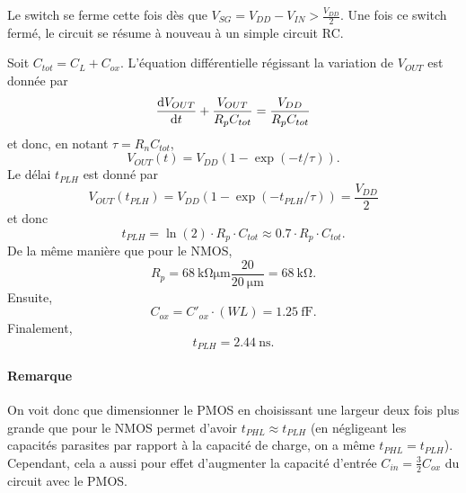 \documentclass[frenchb,DIV=14]{scrartcl}
\begin{document}
\begin{center}
\end{center}

Le switch se ferme cette fois dès que $V_{SG} = V_{DD} - V_{IN} > \frac{V_{DD}}{2}$.
Une fois ce switch fermé, le circuit se résume à nouveau à un simple circuit RC.

\begin{center}
\end{center}

Soit $C_{tot} = C_L + C_{ox}$. L'équation différentielle régissant la variation
de $V_{OUT}$ est donnée par
\[ \frac{\operatorname{d}\! V_{OUT}}{\operatorname{d}\! t} + \frac{V_{OUT}}{R_pC_{tot}} = \frac{V_{DD}}{R_pC_{tot}} \]
et donc, en notant $\tau = R_nC_{tot}$,
\[ V_{OUT}(t) = V_{DD}\left(1 - \exp\left(-t/\tau\right)\right). \]
Le délai $t_{PLH}$ est donné par
\[ V_{OUT}(t_{PLH}) = V_{DD}\left(1 - \exp\left(-t_{PLH}/\tau\right)\right) = \frac{V_{DD}}{2} \]
et donc
\[ t_{PLH} = \ln(2)\cdot R_p\cdot C_{tot} \approx 0.7\cdot R_p\cdot C_{tot}. \]
De la même manière que pour le NMOS,
\[ R_p = \SI{68}{\kilo\ohm\micro\meter}\frac{20}{\SI{20}{\micro\meter}} =
\SI{68}{\kilo\ohm}. \]
Ensuite,
\[ C_{ox} = C'_{ox}\cdot(WL) = \SI{1.25}{\femto\farad}. \]
Finalement,
\[ t_{PLH} = \SI{2.44}{\nano\second}. \]

\paragraph{Remarque} On voit donc que dimensionner le PMOS en choisissant une
largeur deux fois plus grande que pour le NMOS permet d'avoir $t_{PHL} \approx
t_{PLH}$ (en négligeant les capacités parasites par rapport à la capacité
de charge, on a même $t_{PHL} = t_{PLH}$). Cependant, cela a aussi pour effet
d'augmenter la capacité d'entrée $C_{in} = \frac{3}{2}C_{ox}$ du circuit avec
le PMOS.
\end{document}
